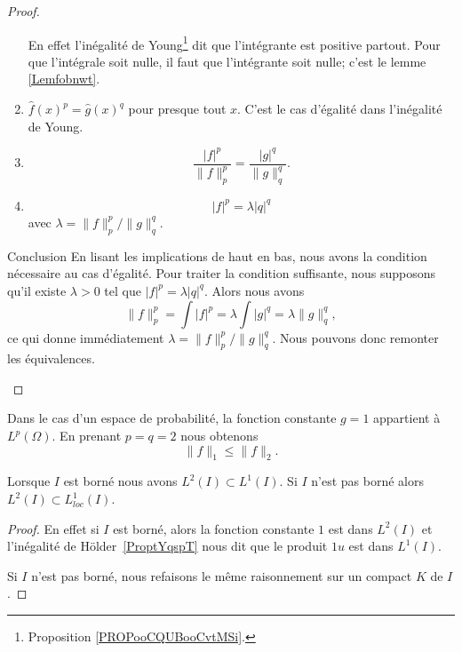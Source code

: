 \begin{proof}
\begin{subproof}
\begin{subproof}
\begin{enumerate}
				      En effet l'inégalité de Young\footnote{Proposition \ref{PROPooCQUBooCvtMSi}.} dit que l'intégrante est positive partout. Pour que l'intégrale soit nulle, il faut que l'intégrante soit nulle; c'est le lemme \ref{Lemfobnwt}.
				\item \( \hat f(x)^p=\hat g(x)^q\) pour presque tout \( x\). C'est le cas d'égalité dans l'inégalité de Young.
				\item
				      \begin{equation}
					      \frac{ | f |^p }{ \| f \|_p^p }=\frac{ | g |^q }{ \| g \|_q^q }.
				      \end{equation}
				\item
				      \begin{equation}
					      | f |^p=\lambda | q |^q
				      \end{equation}
				      avec \( \lambda=\| f \|_p^p/\| g \|_q^q\).
			\end{enumerate}
			\item[Conclusion]
			En lisant les implications de haut en bas, nous avons la condition nécessaire au cas d'égalité. Pour traiter la condition suffisante, nous supposons qu'il existe \( \lambda>0\) tel que \( | f |^p=\lambda| q |^q\). Alors nous avons
			\begin{equation}
				\| f \|_p^p=\int| f |^p=\lambda\int| g |^q=\lambda\| g \|_q^q,
			\end{equation}
			ce qui donne immédiatement \( \lambda=\| f \|_p^p/\| g \|_q^q\). Nous pouvons donc remonter les équivalences.
		\end{subproof}
	\end{subproof}
\end{proof}


\begin{remark}      \label{RemNormuptNird}
	Dans le cas d'un espace de probabilité, la fonction constante \( g=1\) appartient à \( L^p(\Omega)\). En prenant \( p=q=2\) nous obtenons
	\begin{equation}
		\| f \|_1\leq\| f \|_2.
	\end{equation}
\end{remark}

\begin{lemma}   \label{LemTLHwYzD}
	Lorsque \( I\) est borné nous avons \( L^2(I)\subset L^1(I)\). Si \( I\) n'est pas borné alors \( L^2(I)\subset L^1_{loc}(I)\).
\end{lemma}

\begin{proof}
	En effet si \( I\) est borné, alors la fonction constante \( 1\) est dans \( L^2(I)\) et l'inégalité de Hölder~\ref{ProptYqspT} nous dit que le produit \( 1u\) est dans \( L^1(I)\).

	Si \( I\) n'est pas borné, nous refaisons le même raisonnement sur un compact \( K\) de \( I\).
\end{proof}

